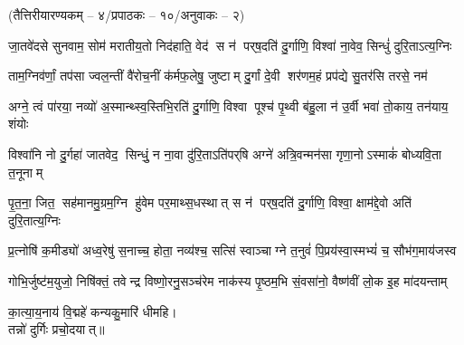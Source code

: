 
\centerline{\normalsize (तैत्तिरीयारण्यकम् – ४/प्रपाठकः – १०/अनुवाकः – २)}

\twolineshloka
{जा॒तवे॑दसे सुनवाम॒ सोम॑ मरातीय॒तो निद॑हाति॒ वेद॑}
{स न॑ पर्‌ष॒दति॑ दु॒र्गाणि॒ विश्वा॑ ना॒वेव॒ सिन्धुं॑ दुरि॒ताऽत्य॒ग्निः}

\twolineshloka
{ताम॒ग्निव॑र्णां॒ तप॑सा ज्वल॒न्तीं वै॑रोच॒नीं क॑र्मफ॒लेषु॒ जुष्टाम्}
{दु॒र्गां दे॒वी शर॑णम॒हं प्रप॑द्ये सु॒तर॑सि तरसे॒ नम॑}

\twolineshloka
{अग्ने॒ त्वं पा॑रया॒ नव्यो॑ अ॒स्मान्थ्स्व॒स्तिभि॒रति॑ दु॒र्गाणि॒ विश्वा}
{पूश्च॑ पृ॒थ्वी ब॑हु॒ला न॑ उ॒र्वी भवा॑ तो॒काय॒ तन॑याय॒ शंयोः} 

\twolineshloka
{विश्वा॑नि नो दु॒र्गहा॑ जातवेद॒ सिन्धुं॒ न ना॒वा दु॑रि॒ताऽति॑पर्‌\mbox{}\hspace{-0.5ex}षि}
{अग्ने॑ अत्रि॒वन्मन॑सा गृणा॒नोऽस्माकं॑ बोध्यवि॒ता त॒नूनाम्}

\twolineshloka
{पृ॒त॒ना॒ जित॒ सह॑मानमु॒ग्रम॒ग्नि हु॑वेम पर॒माथ्स॒धस्थात्}
{स न॑ पर्‌ष॒दति॑ दु॒र्गाणि॒ विश्वा॒ क्षाम॑द्दे॒वो अति॑ दुरि॒तात्य॒ग्निः}

\twolineshloka
{प्र॒त्नोषि॑ क॒मीड्यो॑ अध्व॒रेषु॑ स॒नाच्च॒ होता॒ नव्य॑श्च॒ सत्सि॑}
{स्वाञ्चाग्ने त॒नुवं॑ पि॒प्रय॑स्वा॒स्मभ्यं॑ च॒ सौभ॑ग॒माय॑जस्व}

\twolineshloka
{गोभि॒र्जुष्ट॑म॒युजो॒ निषि॑क्तं॒ तवेन्द्र विष्णो॒रनु॒सञ्च॑रेम}
{नाक॑स्य पृ॒ष्ठम॒भि सं॒वसा॑नो॒ वैष्ण॑वीं लो॒क इ॒ह मा॑दयन्ताम्}

\begin{center}
का॒त्या॒य॒नाय॑ वि॒द्महे॑ कन्यकु॒मारि॑ धीमहि।\\
 तन्नो॑ दुर्गिः प्रचो॒दयात्॥ 
\end{center}

